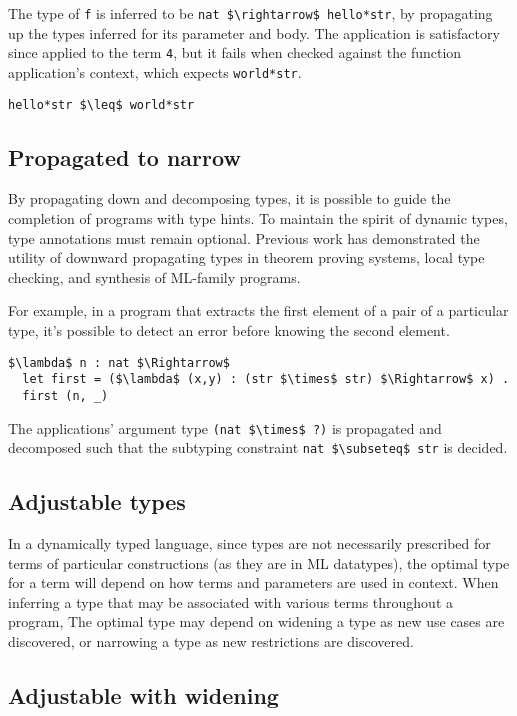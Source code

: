 \documentclass[sigplan]{acmart}
\theoremstyle{definition}
\begin{document}
The type of \lstinline{f} is inferred to be \lstinline{nat $\rightarrow$ hello*str}, 
by propagating up the types inferred for its parameter and body.
The application is satisfactory since applied to the term \lstinline{4}, 
but it fails when checked against the function application's context,
which expects \lstinline{world*str}.
\begin{lstlisting}
hello*str $\leq$ world*str
\end{lstlisting}

\subsection{Propagated to narrow}
By propagating down and decomposing types, 
it is possible to guide the completion of programs with type hints.
To maintain the spirit of dynamic types, type annotations must remain optional.
Previous work has demonstrated the utility of downward propagating types 
in theorem proving systems, local type checking, 
and synthesis of ML-family programs.

For example, in a program that extracts 
the first element of a pair of a particular type, 
it's possible to detect an error before knowing the second element.

\begin{lstlisting}
$\lambda$ n : nat $\Rightarrow$
  let first = ($\lambda$ (x,y) : (str $\times$ str) $\Rightarrow$ x) .
  first (n, _) 
\end{lstlisting}

\noindent The  applications' argument type \lstinline{(nat $\times$ ?)} 
is propagated and decomposed such that the subtyping constraint 
\lstinline{nat $\subseteq$ str} is decided. 

\subsection{Adjustable types}

In a dynamically typed language, since types are not necessarily prescribed
for terms of particular constructions (as they are in ML datatypes), 
the optimal type for a term will depend on how terms and parameters are used in context. 
When inferring a type that may be associated with various terms throughout a program,  
The optimal type may depend on widening a type as new use cases are discovered,
or narrowing a type as new restrictions are discovered. 

\subsection{Adjustable with widening}
\end{document}
